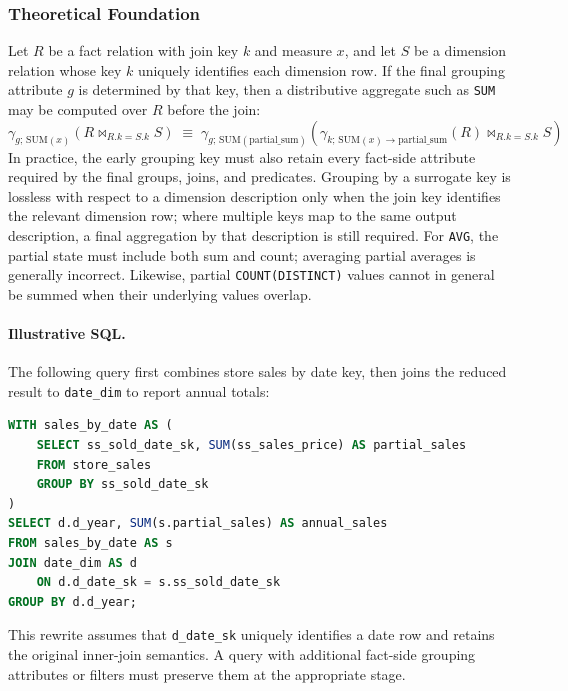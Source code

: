 \documentclass{ULBreport}
\begin{document}
\subsubsection{Theoretical Foundation}
Let $R$ be a fact relation with join key $k$ and measure $x$, and let $S$ be a dimension relation whose key $k$ uniquely identifies each dimension row. If the final grouping attribute $g$ is determined by that key, then a distributive aggregate such as \texttt{SUM} may be computed over $R$ before the join:
\begin{equation}
\gamma_{g;\,\text{SUM}(x)}(R \bowtie_{R.k=S.k} S)
\;\equiv\;
\gamma_{g;\,\text{SUM}(\text{partial\_sum})}
\left(
\gamma_{k;\,\text{SUM}(x)\to\text{partial\_sum}}(R)
\bowtie_{R.k=S.k} S
\right)
\end{equation}
In practice, the early grouping key must also retain every fact-side attribute required by the final groups, joins, and predicates. Grouping by a surrogate key is lossless with respect to a dimension description only when the join key identifies the relevant dimension row; where multiple keys map to the same output description, a final aggregation by that description is still required. For \texttt{AVG}, the partial state must include both sum and count; averaging partial averages is generally incorrect. Likewise, partial \texttt{COUNT(DISTINCT)} values cannot in general be summed when their underlying values overlap.

\paragraph{Illustrative SQL.}
The following query first combines store sales by date key, then joins the reduced result to \texttt{date\_dim} to report annual totals:
\begin{lstlisting}[language=SQL, basicstyle=\ttfamily\scriptsize, breaklines=true, frame=single]
WITH sales_by_date AS (
    SELECT ss_sold_date_sk, SUM(ss_sales_price) AS partial_sales
    FROM store_sales
    GROUP BY ss_sold_date_sk
)
SELECT d.d_year, SUM(s.partial_sales) AS annual_sales
FROM sales_by_date AS s
JOIN date_dim AS d
    ON d.d_date_sk = s.ss_sold_date_sk
GROUP BY d.d_year;
\end{lstlisting}
This rewrite assumes that \texttt{d\_date\_sk} uniquely identifies a date row and retains the original inner-join semantics. A query with additional fact-side grouping attributes or filters must preserve them at the appropriate stage.
\end{document}
